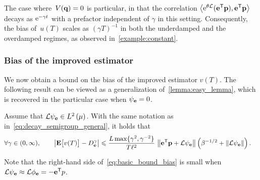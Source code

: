 \documentclass[11pt,a4paper]{article}
\begin{document}
\begin{remark}
The case where~$V(\boldsymbol{\mathbf q}) = 0$ is particular,
in that the correlation $\ip{\e^{\theta \mathcal L} (\vect e^\t \vect p)}{\vect e^\t \vect p}$ decays as $\mathrm{e}^{-\gamma t}$ with a prefactor independent of $\gamma$ in this setting.
Consequently, the bias of~$u(T)$ scales as $(\gamma T)^{-1}$ in both the underdamped and the overdamped regimes,
as observed in~\cref{example:constant}.
\end{remark}

\subsubsection{Bias of the improved estimator}%
\label{ssub:bias_of_the_improved_estimator}
We now obtain a bound on the bias of the improved estimator $v(T)$.
The following result can be viewed as a generalization of~\cref{lemma:easy_lemma},
which is recovered in the particular case when $\psi_{\boldsymbol{\mathbf e}} = 0$.
\begin{proposition}
    \label{lemma:bias_improved}
    Assume that $\mathcal L \psi_{\vect e} \in \lp{2}{\mu}$.
    With the same notation as in~\eqref{eq:decay_semigroup_general},
    it holds that
    \begin{align}
        \label{eq:basic_bound_bias}
        \forall \gamma \in (0, \infty), \qquad
        \abs{\expect \bigl[ v(T) \bigr] - D^{\gamma}_{\vect e}}
                &\leq  \frac{L \max\{\gamma^2, \gamma^{-2}\}}{T \ell^2 }  \,  \norm{\vect e^\t \vect p + \mathcal L \psi_{\vect e}}  \left(\beta^{-1/2} + \norm{\mathcal L \psi_{\vect e}} \right).
    \end{align}
\end{proposition}
Note that the right-hand side of~\eqref{eq:basic_bound_bias} is small when $\mathcal L \psi_{\boldsymbol{\mathbf e}} \approx \mathcal L \phi_{\boldsymbol{\mathbf e}} = - \boldsymbol{\mathbf e}^\mathsf T p$.
\end{document}
